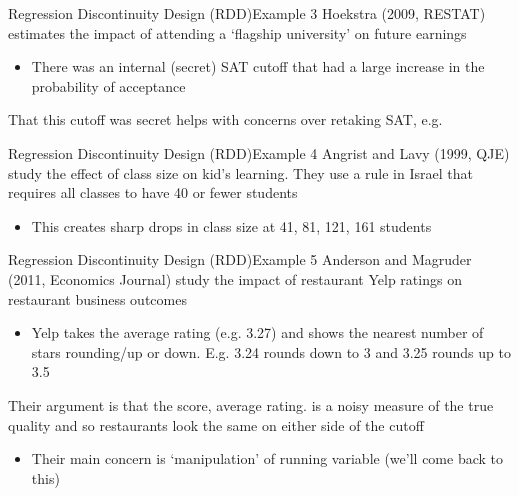 \documentclass[aspectratio=169,t,11pt,table]{beamer}
\begin{document}
\begin{frame}{Regression Discontinuity Design (RDD)}{Example 3}
  Hoekstra (2009, RESTAT) estimates the impact of attending a `flagship university' on future earnings
  \begin{itemize}
    \item There was an internal (secret) SAT cutoff that had a large increase in the probability of acceptance
  \end{itemize}

  \bigskip
  That this cutoff was secret helps with concerns over retaking SAT, e.g.  
\end{frame}


\begin{frame}{Regression Discontinuity Design (RDD)}{Example 4}
  Angrist and Lavy (1999, QJE) study the effect of class size on kid's learning.
  They use a rule in Israel that requires all classes to have 40 or fewer students
  \begin{itemize}
    \item This creates sharp drops in class size at 41, 81, 121, 161 students
  \end{itemize}
\end{frame}



\begin{frame}{Regression Discontinuity Design (RDD)}{Example 5}
  Anderson and Magruder (2011, Economics Journal) study the impact of restaurant Yelp ratings on restaurant business outcomes
  \begin{itemize}
    \item Yelp takes the average rating (e.g. 3.27) and shows the nearest number of stars rounding/up or down. E.g. 3.24 rounds down to 3 and 3.25 rounds up to 3.5
  \end{itemize}

  \pause
  \bigskip
  Their argument is that the score, average rating. is a noisy measure of the true quality and so restaurants look the same on either side of the cutoff
  \begin{itemize}
    \item Their main concern is `manipulation' of running variable (we'll come back to this)
  \end{itemize}
\end{frame}
\end{document}
